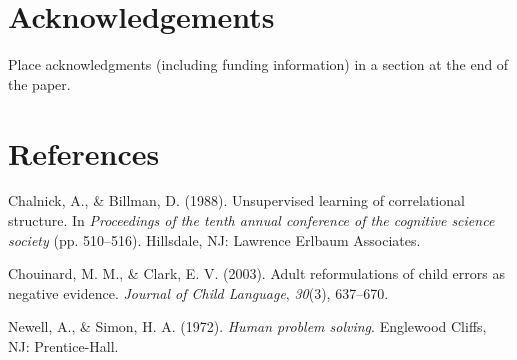 \documentclass[10pt, letterpaper]{article}
\begin{document}
\hypertarget{acknowledgements}{%
\section{Acknowledgements}\label{acknowledgements}}

Place acknowledgments (including funding information) in a section at
the end of the paper.

\hypertarget{references}{%
\section{References}\label{references}}

\setlength{\parindent}{-0.1in} 
\setlength{\leftskip}{0.125in}

\noindent

\hypertarget{refs}{}
\leavevmode\hypertarget{ref-ChalnickBillman1988a}{}%
Chalnick, A., \& Billman, D. (1988). Unsupervised learning of
correlational structure. In \emph{Proceedings of the tenth annual
conference of the cognitive science society} (pp. 510--516). Hillsdale,
NJ: Lawrence Erlbaum Associates.

\leavevmode\hypertarget{ref-chouinard2003}{}%
Chouinard, M. M., \& Clark, E. V. (2003). Adult reformulations of child
errors as negative evidence. \emph{Journal of Child Language},
\emph{30}(3), 637--670.

\leavevmode\hypertarget{ref-NewellSimon1972a}{}%
Newell, A., \& Simon, H. A. (1972). \emph{Human problem solving}.
Englewood Cliffs, NJ: Prentice-Hall.


\end{document}
